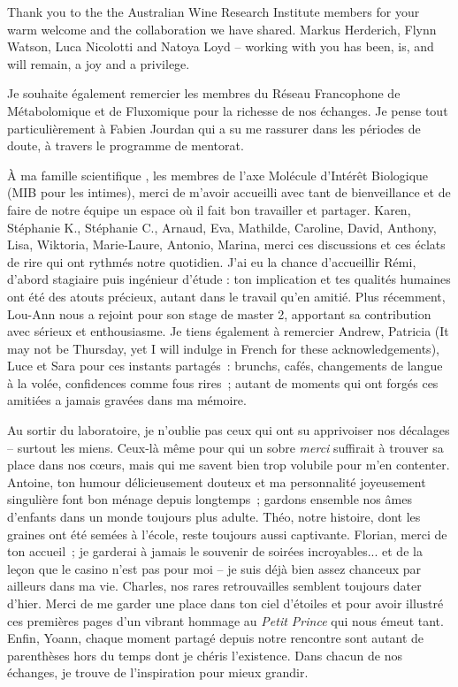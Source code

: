 {Thank you to the the Australian Wine Research Institute members for your warm welcome and the collaboration we have shared. Markus Herderich, Flynn Watson, Luca Nicolotti and Natoya Loyd -- working with you has been, is, and will remain, a joy and a privilege.

Je souhaite également remercier les membres du Réseau Francophone de Métabolomique et de Fluxomique pour la richesse de nos échanges. Je pense tout particulièrement à Fabien Jourdan qui a su me rassurer dans les périodes de doute, à travers le programme de mentorat.

À ma \og famille scientifique \fg{}, les membres de l'axe Molécule d'Intérêt Biologique (MIB pour les intimes), merci de m'avoir accueilli avec tant de bienveillance et de faire de notre équipe un espace où il fait bon travailler et partager. Karen, Stéphanie K., Stéphanie C., Arnaud, Eva, Mathilde, Caroline, David, Anthony, Lisa, Wiktoria, Marie-Laure, Antonio, Marina, merci ces discussions et ces éclats de rire qui ont rythmés notre quotidien. J'ai eu la chance d'accueillir Rémi, d'abord stagiaire puis ingénieur d'étude : ton implication et tes qualités humaines ont été des atouts précieux, autant dans le travail qu'en amitié. Plus récemment, Lou-Ann nous a rejoint pour son stage de master 2, apportant sa contribution avec sérieux et enthousiasme. Je tiens également à remercier Andrew, Patricia (It may not be Thursday, yet I will indulge in French for these acknowledgements), Luce et Sara pour ces instants partagés~: brunchs, cafés, changements de langue à la volée, confidences comme fous rires~; autant de moments qui ont forgés ces amitiées a jamais gravées dans ma mémoire.

Au sortir du laboratoire, je n'oublie pas ceux qui ont su apprivoiser nos décalages -- surtout les miens. Ceux-là même pour qui un sobre \textit{merci} suffirait à trouver sa place dans nos c\oe urs, mais qui me savent bien trop volubile pour m'en contenter. Antoine, ton humour délicieusement douteux et ma personnalité joyeusement singulière font bon ménage depuis longtemps~; gardons ensemble nos âmes d'enfants dans un monde toujours plus adulte. Théo, notre histoire, dont les graines ont été semées à l'école, reste toujours aussi captivante. Florian, merci de ton accueil~; je garderai à jamais le souvenir de soirées incroyables... et de la leçon que le casino n'est pas pour moi -- je suis déjà bien assez chanceux par ailleurs dans ma vie. Charles, nos rares retrouvailles semblent toujours dater d'hier. Merci de me garder une place dans ton ciel d'étoiles et pour avoir illustré ces premières pages d'un vibrant hommage au \textit{Petit Prince} qui nous émeut tant. Enfin, Yoann, chaque moment partagé depuis notre rencontre sont autant de parenthèses hors du temps dont je chéris l'existence. Dans chacun de nos échanges, je trouve de l'inspiration pour mieux grandir.

}
